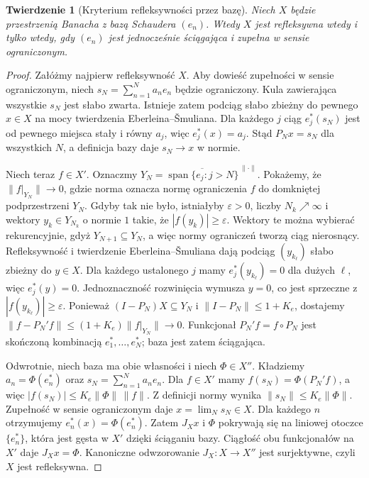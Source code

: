 \documentclass[11pt,a4paper]{article}
\numberwithin{equation}{section}
\theoremstyle{plain}
\newtheorem{twierdzenie}{Twierdzenie}[section]
\theoremstyle{definition}
\theoremstyle{remark}
\begin{document}
\begin{twierdzenie}[Kryterium refleksywności przez bazę]
\label{thm:james-basis27}
Niech $X$ będzie przestrzenią Banacha z bazą Schaudera $(e_n)$.
Wtedy $X$ jest refleksywna wtedy i tylko wtedy, gdy
$(e_n)$ jest jednocześnie ściągająca i zupełna w sensie
ograniczonym.
\end{twierdzenie}
\begin{proof}
Załóżmy najpierw refleksywność $X$.
Aby dowieść zupełności w sensie ograniczonym,
niech $s_N=\sum_{n=1}^Na_ne_n$ będzie ograniczony.
Kula zawierająca wszystkie $s_N$ jest słabo zwarta.
Istnieje zatem podciąg słabo zbieżny do pewnego $x\in X$
na mocy twierdzenia Eberleina--\v Smuliana.
Dla każdego $j$ ciąg $e_j^*(s_N)$ jest od pewnego miejsca
stały i równy $a_j$, więc $e_j^*(x)=a_j$.
Stąd $P_Nx=s_N$ dla wszystkich $N$, a definicja bazy
daje $s_N\to x$ w normie.

Niech teraz $f\in X'$. Oznaczmy
$Y_N=\overline{\operatorname{span}\{e_j:j>N\}}^{\,\|\cdot\|}$.
Pokażemy, że $\|f|_{Y_N}\|\to0$, gdzie norma oznacza
normę ograniczenia $f$ do domkniętej podprzestrzeni $Y_N$.
Gdyby tak nie było, istniałyby $\varepsilon>0$, liczby
$N_k\nearrow\infty$ i wektory $y_k\in Y_{N_k}$
o normie $1$ takie, że $|f(y_k)|\ge\varepsilon$.
Wektory te można wybierać rekurencyjnie, gdyż $Y_{N+1}\subseteq Y_N$,
a więc normy ograniczeń tworzą ciąg nierosnący.
Refleksywność i twierdzenie Eberleina--\v Smuliana
dają podciąg $(y_{k_\ell})$ słabo zbieżny do $y\in X$.
Dla każdego ustalonego $j$ mamy
$e_j^*(y_{k_\ell})=0$ dla dużych $\ell$, więc $e_j^*(y)=0$.
Jednoznaczność rozwinięcia wymusza $y=0$,
co jest sprzeczne z $|f(y_{k_\ell})|\ge\varepsilon$.
Ponieważ $(I-P_N)X\subseteq Y_N$ i $\|I-P_N\|\le1+K_e$,
dostajemy $\|f-P_N'f\|\le(1+K_e)\|f|_{Y_N}\|\to0$.
Funkcjonał $P_N'f=f\circ P_N$ jest skończoną kombinacją
$e_1^*,\ldots,e_N^*$; baza jest zatem ściągająca.

Odwrotnie, niech baza ma obie własności i niech
$\Phi\in X''$. Kładziemy $a_n=\Phi(e_n^*)$ oraz
$s_N=\sum_{n=1}^Na_ne_n$. Dla $f\in X'$ mamy
$f(s_N)=\Phi(P_N'f)$, a więc
$|f(s_N)|\le K_e\|\Phi\|\,\|f\|$.
Z definicji normy wynika $\|s_N\|\le K_e\|\Phi\|$.
Zupełność w sensie ograniczonym daje
$x=\lim_Ns_N\in X$. Dla każdego $n$ otrzymujemy
$e_n^*(x)=\Phi(e_n^*)$.
Zatem $J_Xx$ i $\Phi$ pokrywają się na liniowej otoczce
$\{e_n^*\}$, która jest gęsta w $X'$ dzięki ściąganiu bazy.
Ciągłość obu funkcjonałów na $X'$ daje $J_Xx=\Phi$.
Kanoniczne odwzorowanie $J_X:X\to X''$ jest surjektywne,
czyli $X$ jest refleksywna.
\end{proof}
\end{document}
